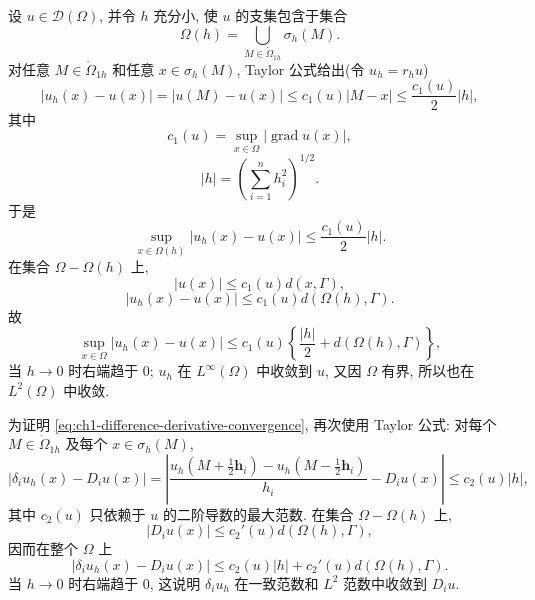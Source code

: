 \begin{Proof}
设 $u\in\mathcal D(\Omega)$, 并令 $h$ 充分小, 使 $u$ 的支集包含于集合
\begin{equation}
\Omega(h)=\bigcup_{M\in\mathring\Omega_{1h}}\sigma_h(M).
\label{eq:ch1-mesh-covered-domain}
\end{equation}
对任意 $M\in\mathring\Omega_{1h}$ 和任意 $x\in\sigma_h(M)$, Taylor 公式给出(令 $u_h=r_hu$)
\[
|u_h(x)-u(x)|=|u(M)-u(x)|
\leq c_1(u)|M-x|\leq\frac{c_1(u)}2|h|,
\]
其中
\begin{equation}
c_1(u)=\sup_{x\in\Omega}|\operatorname{grad}u(x)|,
\label{eq:ch1-first-derivative-constant}
\end{equation}
\begin{equation}
|h|=\left(\sum_{i=1}^nh_i^2\right)^{1/2}.
\label{eq:ch1-vector-mesh-norm}
\end{equation}
于是
\begin{equation}
\sup_{x\in\Omega(h)}|u_h(x)-u(x)|
\leq\frac{c_1(u)}2|h|.
\label{eq:ch1-uniform-error-interior}
\end{equation}
在集合 $\Omega-\Omega(h)$ 上,
\[
|u(x)|\leq c_1(u)d(x,\Gamma),
\]
\begin{equation}
|u_h(x)-u(x)|\leq c_1(u)d(\Omega(h),\Gamma).
\label{eq:ch1-uniform-error-boundary-layer}
\end{equation}
故
\begin{equation}
\sup_{x\in\Omega}|u_h(x)-u(x)|
\leq c_1(u)\left\{\frac{|h|}{2}+d(\Omega(h),\Gamma)\right\},
\label{eq:ch1-uniform-error-global}
\end{equation}
当 $h\to0$ 时右端趋于 $0$; $u_h$ 在 $L^\infty(\Omega)$ 中收敛到 $u$, 又因 $\Omega$ 有界, 所以也在 $L^2(\Omega)$ 中收敛.

为证明 \eqref{eq:ch1-difference-derivative-convergence}, 再次使用 Taylor 公式: 对每个 $M\in\mathring\Omega_{1h}$ 及每个 $x\in\sigma_h(M)$,
\begin{equation}
\left|\delta_iu_h(x)-D_iu(x)\right|
=\left|\frac{u_h(M+\frac12\mathbf h_i)-u_h(M-\frac12\mathbf h_i)}{h_i}
-D_iu(x)\right|
\leq c_2(u)|h|,
\label{eq:ch1-difference-taylor-error}
\end{equation}
其中 $c_2(u)$ 只依赖于 $u$ 的二阶导数的最大范数. 在集合 $\Omega-\Omega(h)$ 上,
\[
|D_iu(x)|\leq c_2'(u)d(\Omega(h),\Gamma),
\]
因而在整个 $\Omega$ 上
\begin{equation}
|\delta_iu_h(x)-D_iu(x)|
\leq c_2(u)|h|+c_2'(u)d(\Omega(h),\Gamma).
\label{eq:ch1-difference-error-global}
\end{equation}
当 $h\to0$ 时右端趋于 $0$, 这说明 $\delta_iu_h$ 在一致范数和 $L^2$ 范数中收敛到 $D_iu$.
\end{Proof}

